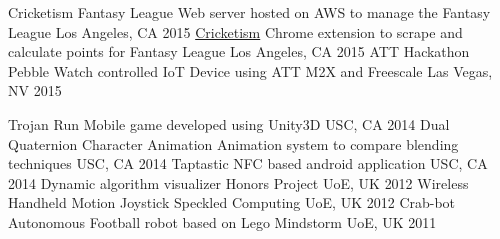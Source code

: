 


\begin{cvhonors}

  \cvhonor
    {Cricketism Fantasy League}
    {Web server hosted on AWS to manage the Fantasy League} %
    {Los Angeles, CA} %
    {2015} %
  \cvhonor
    {\href{https://chrome.google.com/webstore/detail/cricketism-fantasy-league/ipkcgbmkjeabphgknkeiabfebhlpknip?hl=en}{Cricketism}}
    {Chrome extension to scrape and calculate points for Fantasy League} %
    {Los Angeles, CA} %
    {2015} %
  \cvhonor
    {ATT Hackathon} %
    {Pebble Watch controlled IoT Device using ATT M2X and Freescale } %
    {Las Vegas, NV} %
    {2015} %

\end{cvhonors}




\begin{cvhonors}


  \cvhonor
    {Trojan Run} %
    {Mobile game developed using Unity3D} %
    {USC, CA} %
    {2014} %
  \cvhonor
    {Dual Quaternion Character Animation} %
    {Animation system to compare blending techniques} %
    {USC, CA} %
    {2014} %
  \cvhonor
    {Taptastic} %
    {NFC based android application} %
    {USC, CA} %
    {2014} %
  \cvhonor
    {Dynamic algorithm visualizer} %
    {Honors Project} %
    {UoE, UK} %
    {2012} %
  \cvhonor
    {Wireless Handheld Motion Joystick} %
    {Speckled Computing} %
    {UoE, UK} %
    {2012} %
  \cvhonor
    {Crab-bot} %
    {Autonomous Football robot based on Lego Mindstorm} %
    {UoE, UK} %
    {2011} %

\end{cvhonors}


